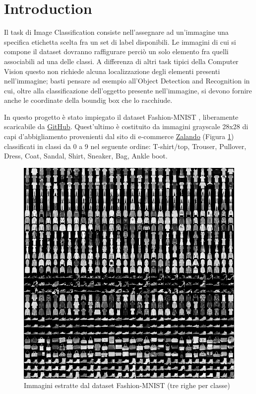 \section{Introduction} \label{sec:introduction}
Il task di Image Classification consiste nell'assegnare ad un'immagine una specifica etichetta scelta fra un set di label disponibili. Le immagini di cui si compone il dataset dovranno raffigurare perciò un solo elemento fra quelli associabili ad una delle classi. A differenza di altri task tipici della Computer Vision questo non richiede alcuna localizzazione degli elementi presenti nell'immagine; basti pensare ad esempio all'Object Detection and Recognition in cui, oltre alla classificazione dell'oggetto presente nell'immagine, si devono fornire anche le coordinate della boundig box che lo racchiude.\par
In questo progetto è stato impiegato il dataset Fashion-MNIST \cite{xiao2017fashion}, liberamente scaricabile da
\href{https://github.com/zalandoresearch/fashion-mnist}{GitHub}. Quest'ultimo è costituito da immagini grayscale 28x28 di capi d'abbigliamento provenienti dal sito di e-commerce \href{https://www.zalando.it/}{Zalando} (Figura \ref{fig1:fashion-MNIST}) classificati in classi da 0 a 9 nel seguente ordine: T-shirt/top, Trouser, Pullover, Dress, Coat, Sandal, Shirt, Sneaker, Bag, Ankle boot.
\begin{figure}[!hbt]
    \centering
    \includegraphics[width=\columnwidth]{images/fashion-mnist-sprite.png}
    \caption{Immagini estratte dal dataset Fashion-MNIST (tre righe per classe)}
    \label{fig1:fashion-MNIST}
\end{figure}
